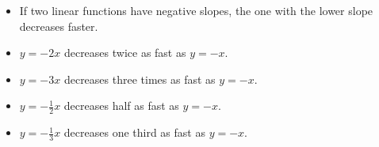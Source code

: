 \begin{frame}
{}%
%
%

\begin{itemize}
\item<1->  If two linear functions have negative slopes, the one with the lower slope decreases faster.
\item<2->  $y = -2x$ decreases twice as fast as $y = -x$.
\item<3->  $y = -3x$ decreases three times as fast as $y = -x$.
\item<4->  $y = -\frac{1}{2}x$ decreases half as fast as $y = -x$.
\item<5->  $y = -\frac{1}{3}x$ decreases one third as fast as $y = -x$.
\end{itemize}
\end{frame}

